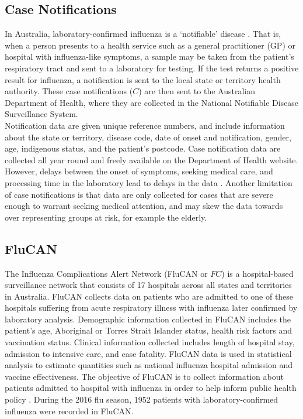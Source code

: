\subsection{Case Notifications}
In Australia, laboratory-confirmed influenza is a `notifiable' disease \cite{Dep of Health 2020}. That is, when a person presents to a health service such as a general practitioner (GP) or hospital with influenza-like symptoms, a sample may be taken from the patient's respiratory tract and sent to a laboratory for testing. If the test returns a positive result for influenza, a notification is sent to the local state or territory health authority. These case notifications ($C$) are then sent to the Australian Department of Health, where they are collected in the National Notifiable Disease Surveillance System.\\
Notification data are given unique reference numbers, and include information about the state or territory, disease code, date of onset and notification, gender, age, indigenous status, and the patient's postcode.
Case notification data are collected all year round and freely available on the Department of Health website. However, delays between the onset of symptoms, seeking medical care, and processing time in the laboratory lead to delays in the data \cite{Clothier 2006}. Another limitation of case notifications is that data are only collected for cases that are severe enough to warrant seeking medical attention, and may skew the data towards over representing groups at risk, for example the elderly.

\subsection{FluCAN}
The Influenza Complications Alert Network (FluCAN or $FC$) is a hospital-based surveillance network that consists of 17 hospitals across all states and territories in Australia. FluCAN collects data on patients who are admitted to one of these hospitals suffering from acute respiratory illness with influenza later confirmed by laboratory analysis. Demographic information collected in FluCAN includes the patient's age, Aboriginal or Torres Strait Islander status, health risk factors and vaccination status. Clinical information collected includes length of hospital stay, admission to intensive care, and case fatality. FluCAN data is used in statistical analysis to estimate quantities such as national influenza hospital admission and vaccine effectiveness.
The objective of FluCAN is to collect information about patients admitted to hospital with influenza in order to help inform public health policy \cite{Cheng 2017}.
During the 2016 flu season, 1952 patients with laboratory-confirmed influenza were recorded in FluCAN.

